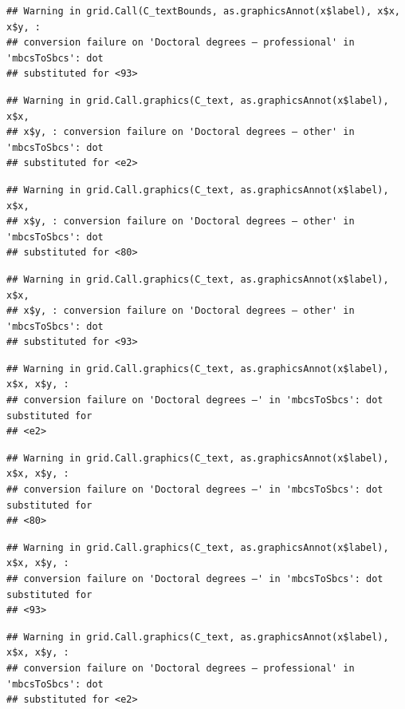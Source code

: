 \documentclass[
]{book}
\begin{document}
\begin{verbatim}
## Warning in grid.Call(C_textBounds, as.graphicsAnnot(x$label), x$x, x$y, :
## conversion failure on 'Doctoral degrees – professional' in 'mbcsToSbcs': dot
## substituted for <93>
\end{verbatim}

\begin{verbatim}
## Warning in grid.Call.graphics(C_text, as.graphicsAnnot(x$label), x$x,
## x$y, : conversion failure on 'Doctoral degrees – other' in 'mbcsToSbcs': dot
## substituted for <e2>
\end{verbatim}

\begin{verbatim}
## Warning in grid.Call.graphics(C_text, as.graphicsAnnot(x$label), x$x,
## x$y, : conversion failure on 'Doctoral degrees – other' in 'mbcsToSbcs': dot
## substituted for <80>
\end{verbatim}

\begin{verbatim}
## Warning in grid.Call.graphics(C_text, as.graphicsAnnot(x$label), x$x,
## x$y, : conversion failure on 'Doctoral degrees – other' in 'mbcsToSbcs': dot
## substituted for <93>
\end{verbatim}

\begin{verbatim}
## Warning in grid.Call.graphics(C_text, as.graphicsAnnot(x$label), x$x, x$y, :
## conversion failure on 'Doctoral degrees –' in 'mbcsToSbcs': dot substituted for
## <e2>
\end{verbatim}

\begin{verbatim}
## Warning in grid.Call.graphics(C_text, as.graphicsAnnot(x$label), x$x, x$y, :
## conversion failure on 'Doctoral degrees –' in 'mbcsToSbcs': dot substituted for
## <80>
\end{verbatim}

\begin{verbatim}
## Warning in grid.Call.graphics(C_text, as.graphicsAnnot(x$label), x$x, x$y, :
## conversion failure on 'Doctoral degrees –' in 'mbcsToSbcs': dot substituted for
## <93>
\end{verbatim}

\begin{verbatim}
## Warning in grid.Call.graphics(C_text, as.graphicsAnnot(x$label), x$x, x$y, :
## conversion failure on 'Doctoral degrees – professional' in 'mbcsToSbcs': dot
## substituted for <e2>
\end{verbatim}
\end{document}
